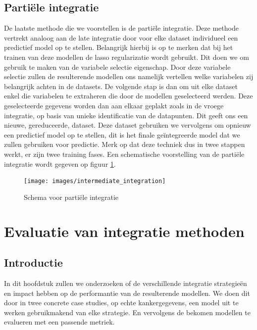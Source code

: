 \begin{abstract*}
\subsection{Parti\"ele integratie}
\label{sec:D:integratie-partieel}
De laatste methode die we voorstellen is de parti\"ele integratie. Deze methode vertrekt analoog aan de late integratie door voor elke dataset individueel een predictief model op te stellen. Belangrijk hierbij is op te merken dat bij het trainen van deze modellen de lasso regularizatie wordt gebruikt. Dit doen we om gebruik te maken van de variabele selectie eigenschap. Door deze variabele selectie zullen de resulterende modellen ons namelijk vertellen welke variabelen zij belangrijk achten in de datasets. De volgende stap is dan om uit elke dataset enkel die variabelen te extraheren die door de modellen geselecteerd werden. Deze geselecteerde gegevens worden dan aan elkaar geplakt zoals in de vroege integratie, op basis van unieke identificatie van de datapunten. Dit geeft ons een nieuwe, gereduceerde, dataset. Deze dataset gebruiken we vervolgens om opnieuw een predictief model op te stellen, dit is het finale ge\"integreerde model dat we zullen gebruiken voor predictie. Merk op dat deze techniek dus in twee stappen werkt, er zijn twee training fases. Een schematische voorstelling van de parti\"ele integratie wordt gegeven op figuur \ref{fig:D:integratie-partieel}.

\begin{figure}
	\centering
	\texttt{[image: images/intermediate\_integration]}
	\caption{Schema voor parti\"ele integratie}
	\label{fig:D:integratie-partieel}
\end{figure}

\section{Evaluatie van integratie methoden}
\label{cha:D:evaluatie}

\subsection{Introductie}
\label{sec:D:evaluatie-introductie}
In dit hoofdstuk zullen we onderzoeken of de verschillende integratie strategie\"en en impact hebben op de performantie van de resulterende modellen. We doen dit door in twee concrete case studies, op echte kankergegevens, een model uit te werken gebruikmakend van elke strategie. En vervolgens de bekomen modellen te evalueren met een passende metriek.


\end{abstract*}

